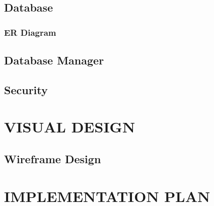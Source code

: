\documentclass[letterpaper,12pt,2p]{elsarticle}
\begin{document}
\subsection{ Database}
\label{subsec1}





\subsubsection{ ER Diagram}
\label{subsec1}





\subsection{ Database Manager}
\label{subsec1}





\subsection{ Security}
\label{subsec1}




\newpage 

\section{VISUAL DESIGN}




\subsection{Wireframe Design}
\label{subsec1}



\newpage 

\section{IMPLEMENTATION PLAN}
\end{document}
